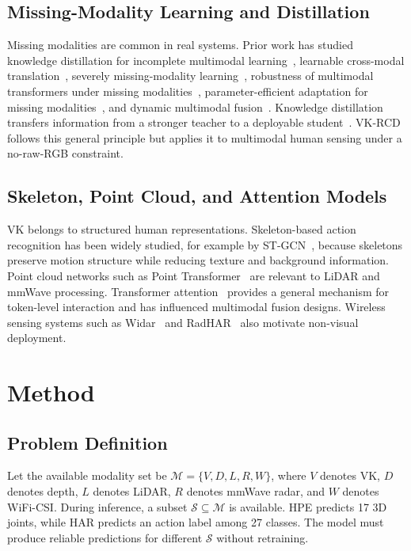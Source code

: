 \documentclass[journal, twocolumn, transmag]{IEEEtran}
\newcommand{\method}{VK-RCD}
\begin{document}
\subsection{Missing-Modality Learning and Distillation}
Missing modalities are common in real systems. Prior work has studied knowledge distillation for incomplete multimodal learning~\cite{incompletekd}, learnable cross-modal translation~\cite{lckd}, severely missing-modality learning~\cite{smil}, robustness of multimodal transformers under missing modalities~\cite{missingtransformer}, parameter-efficient adaptation for missing modalities~\cite{paramadapt}, and dynamic multimodal fusion~\cite{dynamicfusion}. Knowledge distillation transfers information from a stronger teacher to a deployable student~\cite{hinton}. \method{} follows this general principle but applies it to multimodal human sensing under a no-raw-RGB constraint.

\subsection{Skeleton, Point Cloud, and Attention Models}
VK belongs to structured human representations. Skeleton-based action recognition has been widely studied, for example by ST-GCN~\cite{stgcn}, because skeletons preserve motion structure while reducing texture and background information. Point cloud networks such as Point Transformer~\cite{pointtransformer} are relevant to LiDAR and mmWave processing. Transformer attention~\cite{transformer} provides a general mechanism for token-level interaction and has influenced multimodal fusion designs. Wireless sensing systems such as Widar~\cite{widar} and RadHAR~\cite{radhar} also motivate non-visual deployment.

\section{Method}
\subsection{Problem Definition}
Let the available modality set be $\mathcal{M}=\{V,D,L,R,W\}$, where $V$ denotes VK, $D$ denotes depth, $L$ denotes LiDAR, $R$ denotes mmWave radar, and $W$ denotes WiFi-CSI. During inference, a subset $\mathcal{S}\subseteq\mathcal{M}$ is available. HPE predicts 17 3D joints, while HAR predicts an action label among 27 classes. The model must produce reliable predictions for different $\mathcal{S}$ without retraining.
\end{document}
